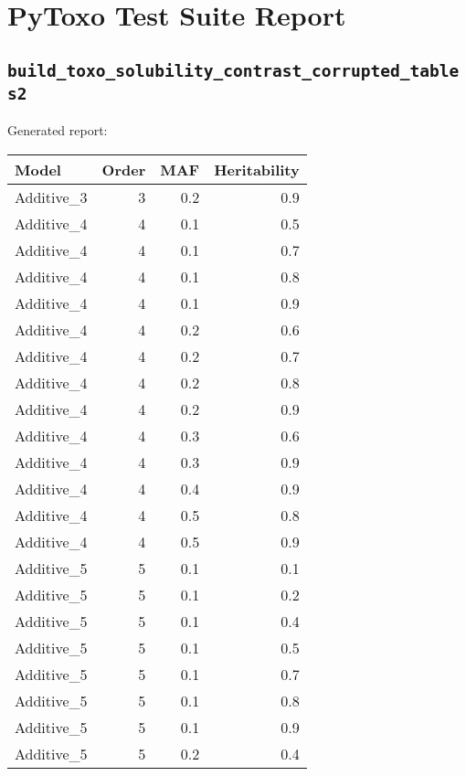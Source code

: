 \documentclass{article}
\begin{document}
\section*{PyToxo Test Suite Report}
\subsection*{\texttt{build\_toxo\_solubility\_contrast\_corrupted\_tables2}}
Generated report:

\begin{longtable}[H]{lrrr}
\hline
 Model      &   Order &   MAF &   Heritability \\
\hline
 Additive\_3 &       3 &   0.2 &            0.9 \\
 Additive\_4 &       4 &   0.1 &            0.5 \\
 Additive\_4 &       4 &   0.1 &            0.7 \\
 Additive\_4 &       4 &   0.1 &            0.8 \\
 Additive\_4 &       4 &   0.1 &            0.9 \\
 Additive\_4 &       4 &   0.2 &            0.6 \\
 Additive\_4 &       4 &   0.2 &            0.7 \\
 Additive\_4 &       4 &   0.2 &            0.8 \\
 Additive\_4 &       4 &   0.2 &            0.9 \\
 Additive\_4 &       4 &   0.3 &            0.6 \\
 Additive\_4 &       4 &   0.3 &            0.9 \\
 Additive\_4 &       4 &   0.4 &            0.9 \\
 Additive\_4 &       4 &   0.5 &            0.8 \\
 Additive\_4 &       4 &   0.5 &            0.9 \\
 Additive\_5 &       5 &   0.1 &            0.1 \\
 Additive\_5 &       5 &   0.1 &            0.2 \\
 Additive\_5 &       5 &   0.1 &            0.4 \\
 Additive\_5 &       5 &   0.1 &            0.5 \\
 Additive\_5 &       5 &   0.1 &            0.7 \\
 Additive\_5 &       5 &   0.1 &            0.8 \\
 Additive\_5 &       5 &   0.1 &            0.9 \\
 Additive\_5 &       5 &   0.2 &            0.4 \\

\end{longtable}
\end{document}

